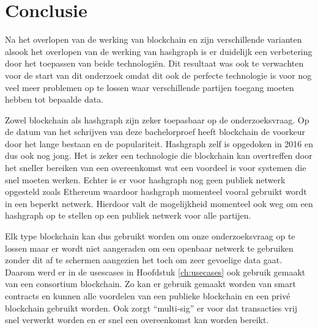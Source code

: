 
\chapter{Conclusie}
\label{ch:conclusie}


Na het overlopen van de werking van blockchain en zijn verschillende varianten alsook het overlopen van de werking van hashgraph is er duidelijk een verbetering door het toepassen van beide technologiën. Dit resultaat was ook te verwachten voor de start van dit onderzoek omdat dit ook de perfecte technologie is voor nog veel meer problemen op te lossen waar verschillende partijen toegang moeten hebben tot bepaalde data. 

Zowel blockchain als hashgraph zijn zeker toepasbaar op de onderzoeksvraag. Op de datum van het schrijven van deze bachelorproef heeft blockchain de voorkeur door het lange bestaan en de populariteit. Hashgraph zelf is opgedoken in 2016 en dus ook nog jong. Het is zeker een technologie die blockchain kan overtreffen door het sneller bereiken van een overeenkomst wat een voordeel is voor systemen die snel moeten werken. Echter is er voor hashgraph nog geen publiek netwerk opgesteld zoals Ethereum waardoor hashgraph momenteel vooral gebruikt wordt in een beperkt netwerk. Hierdoor valt de mogelijkheid momenteel ook weg om een hashgraph op te stellen op een publiek netwerk voor alle partijen.

Elk type blockchain kan dus gebruikt worden om onze onderzoeksvraag op te lossen maar er wordt niet aangeraden om een openbaar netwerk te gebruiken zonder dit af te schermen aangezien het toch om zeer gevoelige data gaat. Daarom werd er in de usescases in Hoofdstuk \ref{ch:usecases} ook gebruik gemaakt van een consortium blockchain. Zo kan er gebruik gemaakt worden van smart contracts en kunnen alle voordelen van een publieke blockchain en een privé blockchain gebruikt worden. Ook zorgt ``multi-sig'' er voor dat transacties vrij snel verwerkt worden en er snel een overeenkomst kan worden bereikt.

